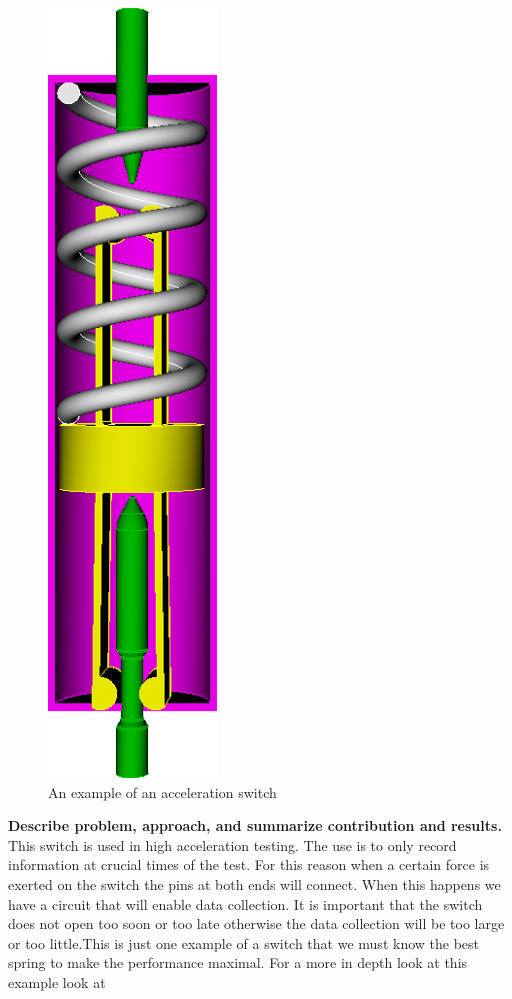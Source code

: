 \documentclass[10pt]{article}
\begin{document}
		\begin{figure}[h]
		 \begin{center}\includegraphics[scale=.2]{Acceleration_Switch.png}\end{center}
		 \caption{An example of an acceleration switch}
		 \label{Acceleration Switch}
		 
		 \end{figure}
		 
		
\textbf{Describe problem, approach, and summarize contribution and results.}
This switch is used in high acceleration testing. The use is to only record information at crucial times of the test. For this reason when a certain force is exerted on the switch the pins at both ends will connect. When this happens we have a circuit that will enable data collection. It is important that the switch does not open too soon or too late otherwise the data collection will be too large or too little.This is just one example of a switch that we must know the best spring to make the performance maximal. For a more in depth look at this example look at \cite{IMSM2010}
\end{document}
